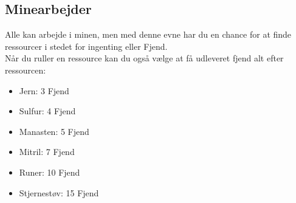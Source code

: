 \subsection{Minearbejder}
Alle kan arbejde i minen, men med denne evne har du en chance for at finde ressourcer i stedet for ingenting eller Fjend.\\ 
Når du ruller en ressource kan du også vælge at få udleveret fjend alt efter ressourcen:
\begin{itemize}
    \item Jern: 3 Fjend
    \item Sulfur: 4 Fjend
    \item Manasten: 5 Fjend
    \item Mitril: 7 Fjend
    \item Runer: 10 Fjend
    \item Stjernestøv: 15 Fjend
\end{itemize}